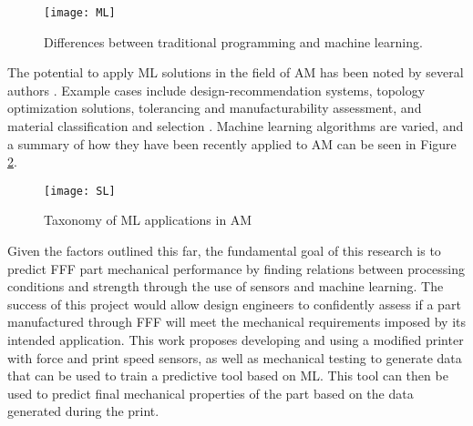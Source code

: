 \documentclass[main.tex]{subfiles}
\begin{document}
\begin{figure}[!htbp]
	\center
	\texttt{[image: ML]}
	\caption{Differences between traditional programming and machine learning. \cite{Chollet2018}} \label{fig:MLvsP}
\end{figure}

The potential to apply ML solutions in the field of AM has been noted by several authors \cite{Razvi2019,Meng2020}. Example cases include design-recommendation systems, topology optimization solutions, tolerancing and manufacturability assessment, and material classification and selection \cite{Razvi2019}. Machine learning algorithms are varied, and a summary of how they have been recently applied to AM can be seen in Figure \ref{fig:supL}.

\begin{figure}[!htbp]
	\center
	\texttt{[image: SL]}
	\caption{Taxonomy of ML applications in AM \cite{Meng2020}} \label{fig:supL}
\end{figure}

Given the factors outlined this far, the fundamental goal of this research is to predict FFF part mechanical performance by finding relations between processing conditions and strength through the use of sensors and machine learning. The success of this project would allow design engineers to confidently assess if a part manufactured through FFF will meet the mechanical requirements imposed by its intended application. This work proposes developing and using a modified printer with force and print speed sensors, as well as mechanical testing to generate data that can be used to train a predictive tool based on ML. This tool can then be used to predict final mechanical properties of the part based on the data generated during the print. 

% 
%
%
% 
% 
% 
% 
% 
% 
% 
% 
% 
%
%
%
%
\end{document}

